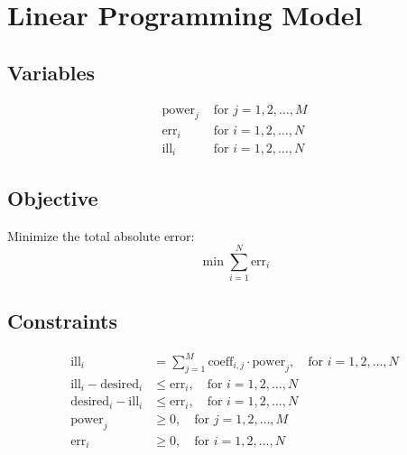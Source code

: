 \documentclass{article}
\begin{document}
\section*{Linear Programming Model}

\subsection*{Variables}
\begin{align*}
\text{power}_j & \text{ for } j = 1, 2, \ldots, M \\
\text{err}_i & \text{ for } i = 1, 2, \ldots, N \\
\text{ill}_i & \text{ for } i = 1, 2, \ldots, N
\end{align*}

\subsection*{Objective}
Minimize the total absolute error:
\[
\min \sum_{i=1}^{N} \text{err}_i
\]

\subsection*{Constraints}
\begin{align*}
\text{ill}_i & = \sum_{j=1}^{M} \text{coeff}_{i,j} \cdot \text{power}_j, \quad \text{for } i = 1, 2, \ldots, N \\
\text{ill}_i - \text{desired}_i & \leq \text{err}_i, \quad \text{for } i = 1, 2, \ldots, N \\
\text{desired}_i - \text{ill}_i & \leq \text{err}_i, \quad \text{for } i = 1, 2, \ldots, N \\
\text{power}_j & \geq 0, \quad \text{for } j = 1, 2, \ldots, M \\
\text{err}_i & \geq 0, \quad \text{for } i = 1, 2, \ldots, N
\end{align*}
\end{document}
